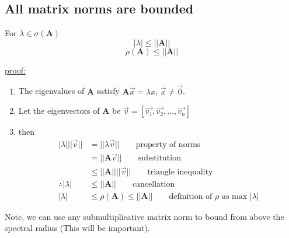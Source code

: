 \documentclass[12pt]{article}
\newcommand{\ve}[1]{\ensuremath{\mathbf{#1}}}
\newcommand{\cc}[1]{\ensuremath{\overline{#1}}}
\newcommand{\ccm}[1]{\ensuremath{\overline{\mathbf{#1}}}}
\begin{document}
 
\subsection{All matrix norms are bounded}

For $\lambda \in \sigma(\ve{A})$ 
\[|\lambda | \leq ||\ve{A}||\]
\[\rho(\ve{A}) \leq ||\ve{A}||\]

\underline{proof:} 
\begin{enumerate}
\item The eigenvalues of $\ve{A}$ satisfy $\ve{A}\vec{x} = \lambda x$, $\vec{x} \neq \vec{0}$. 

\item Let the eigenvectors of $\ve{A}$ be $\vec{v} = [\vec{v_1}, \vec{v_2}, \dots, \vec{v_n}]$

\item then 
\begin{align}
|\lambda | ||\vec{v}|| &= ||\lambda \vec{v}|| 
\qquad \text{property of norms} \nonumber \\
%
                     &= ||\ve{A}\vec{v}|| 
                     \qquad \text{substitution} \nonumber \\
%
                     &\leq ||\ve{A}|| ||\vec{v}||
                     \qquad \text{triangle inequality} \nonumber \\
%
\therefore |\lambda | &\leq ||\ve{A}|| 
\qquad \text{cancellation}\nonumber \\
%
|\lambda| &\leq \rho(\ve{A}) \leq ||\ve{A}|| 
\qquad \text{definition of }\rho\text{ as max }|\lambda | \nonumber
\end{align}
\end{enumerate}

Note, we can use any submultiplicative matrix norm to bound from above the spectral radius (This will be important).
\end{document}

